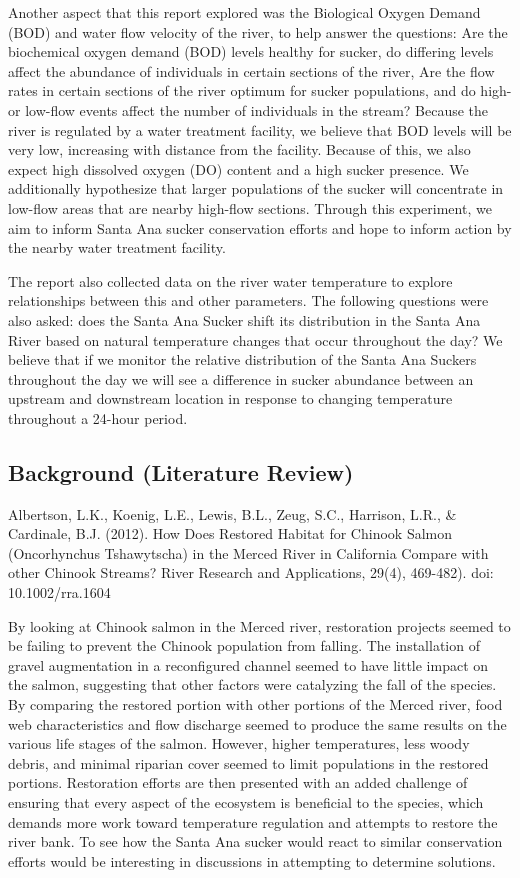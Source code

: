 \documentclass{article}\usepackage[]{graphicx}\usepackage[]{color}
\begin{document}
Another aspect that this report explored was the Biological Oxygen Demand (BOD) and water flow velocity of the river, to help answer the questions: Are the biochemical oxygen demand (BOD) levels healthy for sucker, do differing levels affect the abundance of individuals in certain sections of the river, Are the flow rates in certain sections of the river optimum for sucker populations, and do high- or low-flow events affect the number of individuals in the stream? Because the river is regulated by a water treatment facility, we believe that BOD levels will be very low, increasing with distance from the facility. Because of this, we also expect high dissolved oxygen (DO) content and a high sucker presence. We additionally hypothesize that larger populations of the sucker will concentrate in low-flow areas that are nearby high-flow sections. Through this experiment, we aim to inform Santa Ana sucker conservation efforts and hope to inform action by the nearby water treatment facility. 


The report also collected data on the river water temperature to explore relationships between this and other parameters. The following questions were also asked: does the Santa Ana Sucker shift its distribution in the Santa Ana River based on natural temperature changes that occur throughout the day? We believe that if we monitor the relative distribution of the Santa Ana Suckers throughout the day we will see a difference in sucker abundance between an upstream and downstream location in response to changing temperature throughout a 24-hour period. 

\subsection{Background (Literature Review)}

 
Albertson, L.K., Koenig, L.E., Lewis, B.L., Zeug, S.C., Harrison, L.R., \& Cardinale, B.J. (2012). How Does Restored Habitat for Chinook Salmon (Oncorhynchus Tshawytscha) in the Merced River in California Compare with other Chinook Streams? River Research and Applications, 29(4), 469-482). doi: 10.1002/rra.1604

By looking at Chinook salmon in the Merced river, restoration projects seemed to be failing to prevent the Chinook population from falling. The installation of gravel augmentation in a reconfigured channel seemed to have little impact on the salmon, suggesting that other factors were catalyzing the fall of the species. By comparing the restored portion with other portions of the Merced river, food web characteristics and flow discharge seemed to produce the same results on the various life stages of the salmon. However, higher temperatures, less woody debris, and minimal riparian cover seemed to limit populations in the restored portions. Restoration efforts are then presented with an added challenge of ensuring that every aspect of the ecosystem is beneficial to the species, which demands more work toward temperature regulation and attempts to restore the river bank. To see how the Santa Ana sucker would react to similar conservation efforts would be interesting in discussions in attempting to determine solutions. 
\end{document}
